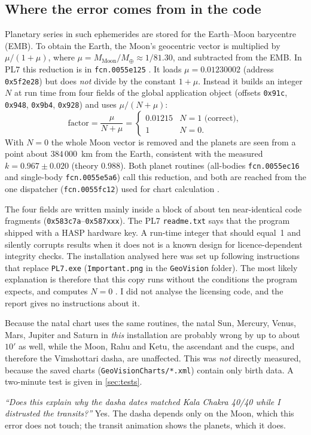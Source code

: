 \subsection{Where the error comes from in the code}

Planetary series in such ephemerides are stored for the Earth--Moon barycentre (EMB). To
obtain the Earth, the Moon's geocentric vector is multiplied by $\mu/(1+\mu)$, where
$\mu = M_{\text{Moon}}/M_\oplus \approx 1/81.30$, and subtracted from the EMB. In PL7 this
reduction is in \texttt{fcn.0055e125} \tagBIN. It loads $\mu = 0.01230002$ (address
\texttt{0x5f2e28}) but does \emph{not} divide by the constant $1 + \mu$. Instead it builds
an integer $N$ at run time from four fields of the global application object (offsets
\texttt{0x91c}, \texttt{0x948}, \texttt{0x9b4}, \texttt{0x928}) and uses $\mu/(N + \mu)$:
\begin{equation}
  \text{factor} = \frac{\mu}{N + \mu} =
  \begin{cases} 0.01215 & N = 1 \text{ (correct)},\\ 1 & N = 0. \end{cases}
\end{equation}
With $N = 0$ the whole Moon vector is removed and the planets are seen from a point about
$384\,000$~km from the Earth, consistent with the measured $k = 0.967 \pm 0.020$ (theory
$0.988$). Both planet routines (all-bodies \texttt{fcn.0055ec16} and single-body
\texttt{fcn.0055e5a6}) call this reduction, and both are reached from the one dispatcher
(\texttt{fcn.0055fc12}) used for chart calculation \tagBIN.

The four fields are written mainly inside a block of about ten near-identical code
fragments (\texttt{0x583c7a}--\texttt{0x587xxx}). The PL7 \texttt{readme.txt} says that
the program shipped with a HASP hardware key. A run-time integer that should equal~1 and
silently corrupts results when it does not is a known design for licence-dependent
integrity checks. The installation analysed here was set up following instructions that
replace \texttt{PL7.exe} (\texttt{Important.png} in the \texttt{GeoVision} folder). The most
likely explanation is therefore that this copy runs without the conditions the program
expects, and computes $N = 0$ \tagINF. I did not analyse the licensing code, and the
report gives no instructions about it.

\begin{warnbox}\kpit Because the natal chart uses the same routines, the natal Sun,
Mercury, Venus, Mars, Jupiter and Saturn in \emph{this} installation are probably wrong by
up to about $10'$ as well, while the Moon, Rahu and Ketu, the ascendant and the cusps, and
therefore the Vimshottari dasha, are unaffected. This was \emph{not} directly measured,
because the saved charts (\texttt{GeoVisionCharts/*.xml}) contain only birth data. A
two-minute test is given in \autoref{sec:tests}.\end{warnbox}

\begin{qbox}\kq \emph{``Does this explain why the dasha dates matched Kala Chakra 40/40
while I distrusted the transits?''} Yes. The dasha depends only on the Moon, which this
error does not touch; the transit animation shows the planets, which it does.\end{qbox}
